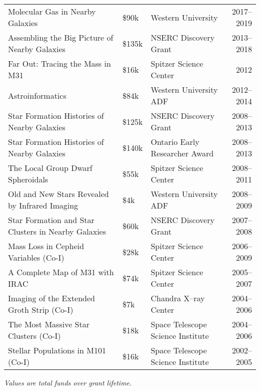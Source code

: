 \begin{tabularx}{\textwidth}{Xlp{5cm}r}
Molecular Gas in Nearby Galaxies & \$90k& Western University  & 2017--2019\\ 

Assembling the Big Picture of Nearby Galaxies & \$135k & NSERC Discovery Grant & 2013--2018 \\ 

Far Out: Tracing the Mass in M31& \$16k& Spitzer Science Center & 2012\\ 

Astroinformatics & \$84k& Western University ADF& 2012--2014\\ 

 Star Formation Histories of Nearby Galaxies & \$125k& NSERC Discovery Grant & 2008--2013\\ 

Star Formation Histories of Nearby Galaxies & \$140k& Ontario Early Researcher Award& 2008--2013\\ 

 The Local Group Dwarf Spheroidals & \$55k& Spitzer Science Center & 2008--2011\\ 

Old and New Stars Revealed by Infrared Imaging & \$4k& Western University ADF  & 2008--2009\\

Star Formation and Star Clusters in Nearby Galaxies & \$60k& NSERC Discovery Grant&2007--2008\\  %

Mass Loss in Cepheid Variables (Co-I)& \$28k& Spitzer Science Center & 2006--2009\\ 

 A Complete Map of M31 with IRAC & \$74k& Spitzer Science Center & 2005--2007\\

Imaging of the Extended Groth Strip (Co-I)& \$7k& Chandra X--ray Center& 2004--2006\\ 

The Most Massive Star Clusters (Co-I)& \$18k & Space Telescope Science Institute& 2004--2006\\ 

Stellar Populations in M101 (Co-I)& \$16k & Space Telescope Science Institute& 2002--2005\\ 
\end{tabularx}

{\em Values are total funds over grant lifetime.}